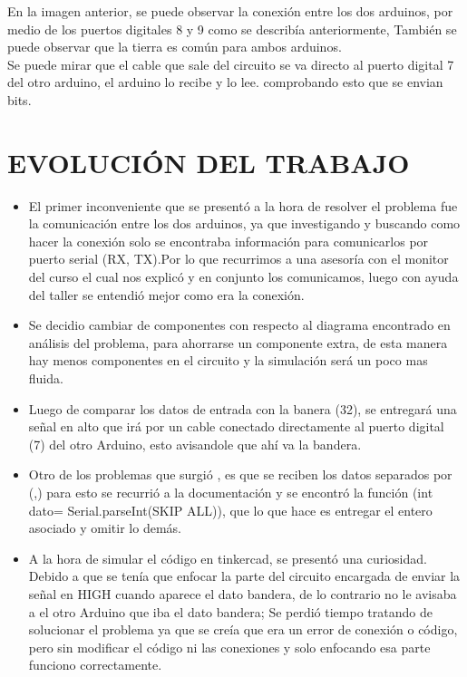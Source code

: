 \documentclass{article}
\begin{document}
En la imagen anterior, se puede observar la conexión entre los dos arduinos, por medio de los puertos digitales 8 y 9 como se describía anteriormente, También se puede observar que la tierra es común para ambos arduinos.\\

Se puede mirar que el cable que sale del circuito se va directo al puerto digital 7 del otro arduino, el arduino lo recibe y lo lee. comprobando esto que se envian bits.







\newpage
\section{EVOLUCIÓN DEL TRABAJO}
\label{evolucion}
\begin{itemize}
\item El primer inconveniente que se presentó a la hora de resolver el problema fue la comunicación entre los dos arduinos, ya que investigando y buscando como hacer la conexión solo se encontraba información para comunicarlos por puerto serial (RX, TX).Por lo que recurrimos a una asesoría con el monitor del curso el cual nos explicó y en conjunto los comunicamos, luego con ayuda del taller se entendió mejor como era la conexión.

\item Se decidio cambiar de componentes con respecto al diagrama encontrado en análisis del problema, para ahorrarse un componente extra, de esta manera hay menos componentes en el circuito y la simulación será un poco mas fluida.

\item Luego de comparar los datos de entrada con la banera (32), se entregará una señal en alto que irá por un cable conectado directamente al puerto digital (7) del otro Arduino, esto avisandole que ahí va la bandera.

\item Otro de los problemas que surgió , es que se reciben los datos separados por (,) para esto se recurrió a la documentación y se encontró la función (int dato= Serial.parseInt(SKIP ALL)), que lo que hace es entregar el entero asociado y omitir lo demás.

\item A la hora de simular el código en tinkercad, se presentó una curiosidad. Debido a que se tenía que enfocar la parte del circuito encargada de enviar la señal en HIGH cuando aparece el dato bandera, de lo contrario no le avisaba a el otro Arduino que iba el dato bandera; Se perdió tiempo  tratando de solucionar el problema ya que se creía que era un error de conexión o código, pero sin modificar el código ni las conexiones y solo enfocando esa parte funciono correctamente.


\end{itemize}
\end{document}
